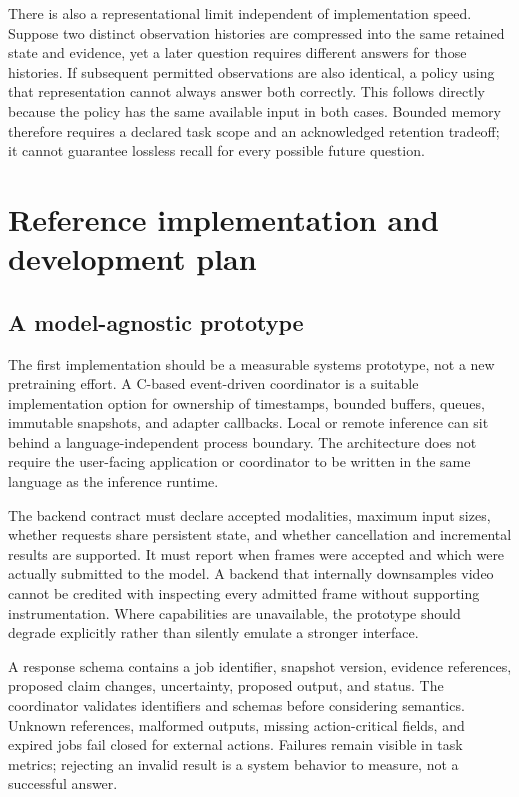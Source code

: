 \documentclass[11pt,letterpaper]{article}
\begin{document}
There is also a representational limit independent of implementation speed. Suppose two distinct observation histories are compressed into the same retained state and evidence, yet a later question requires different answers for those histories. If subsequent permitted observations are also identical, a policy using that representation cannot always answer both correctly. This follows directly because the policy has the same available input in both cases. Bounded memory therefore requires a declared task scope and an acknowledged retention tradeoff; it cannot guarantee lossless recall for every possible future question.

\section{Reference implementation and development plan}
\subsection{A model-agnostic prototype}
The first implementation should be a measurable systems prototype, not a new pretraining effort. A C-based event-driven coordinator is a suitable implementation option for ownership of timestamps, bounded buffers, queues, immutable snapshots, and adapter callbacks. Local or remote inference can sit behind a language-independent process boundary. The architecture does not require the user-facing application or coordinator to be written in the same language as the inference runtime.

The backend contract must declare accepted modalities, maximum input sizes, whether requests share persistent state, and whether cancellation and incremental results are supported. It must report when frames were accepted and which were actually submitted to the model. A backend that internally downsamples video cannot be credited with inspecting every admitted frame without supporting instrumentation. Where capabilities are unavailable, the prototype should degrade explicitly rather than silently emulate a stronger interface.

A response schema contains a job identifier, snapshot version, evidence references, proposed claim changes, uncertainty, proposed output, and status. The coordinator validates identifiers and schemas before considering semantics. Unknown references, malformed outputs, missing action-critical fields, and expired jobs fail closed for external actions. Failures remain visible in task metrics; rejecting an invalid result is a system behavior to measure, not a successful answer.
\end{document}

